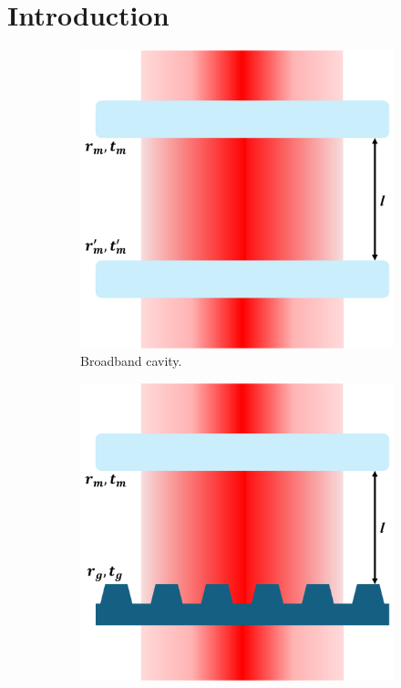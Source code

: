 \newpage
\section{Introduction}

\begin{figure}
    \centering
    \begin{subfigure}[b]{0.3\textwidth}
        \includegraphics[width=\textwidth]{figures/broadband_sketch.pdf}
        \caption{Broadband cavity.}
    \end{subfigure}
    \hfill
    \begin{subfigure}[b]{0.3\textwidth}
        \includegraphics[width=\textwidth]{figures/single_fano_sketch.pdf}

\end{subfigure}
\end{figure}
